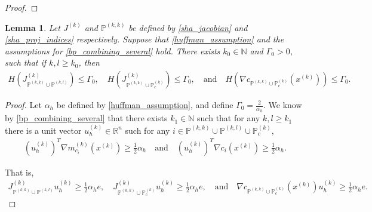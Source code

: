 \documentclass{article}
\newtheorem{lemma}[theorem]{Lemma}
\theoremstyle{case}
\numberwithin{theorem}{subsection}
\newcommand{\gmcik}{{\nabla m_{c_i}^{(k)}\left(\xk\right)}}
\newcommand{\huff}{{\Gamma_0}}
\newcommand{\naturals}{\mathbb N}
\newcommand{\Rn}{\mathbb R^n}
\newcommand{\xk}{x^{(k)}}
\newcommand{\trueactiveprojk}{{\mathbb P_c^{(k)}}}
\newcommand{\activeprojkk}{{\mathbb P^{(k, k)}}}
\newcommand{\activeprojkl}{{\mathbb P^{(k, l)}}}
\newcommand{\jackk}{{J^{(k)}}}
\newcommand{\jackkl}{{J^{(k)}_{\activeprojkk \cup \activeprojkl}}}
\newcommand{\jackt}{{J^{(k)}_{\activeprojkk \cup \trueactiveprojk}}}
\newcommand{\huffalpha}{{\alpha_h}}
\newcommand{\huffdirk}{{u^{(k)}_h}}
\begin{document}
\begin{proof}
\end{proof}


\begin{lemma}
\label{huffman_constant_is_bounded}
Let $\jackk$ and $\activeprojkk$ be defined by \cref{sha_jacobian} and \cref{sha_proj_indices} respectively.
Suppose that \cref{huffman_assumption} and the assumptions for \cref{bp_combining_several} hold.
There exists $k_0 \in \naturals$ and $\huff > 0$, such that if $k, l \ge k_0$, then 
\begin{align*}
H\left(\jackkl \right) \le \huff,
\quad 
H\left(\jackt\right) \le \huff,
\quad \textrm{and} \quad
H\left(\nabla c_{\activeprojkk \cup \trueactiveprojk }\left(\xk\right)\right) \le \huff.
\end{align*}
\end{lemma}

\begin{proof}
Let $\huffalpha$ be defined by \cref{huffman_assumption}, and define $\huff = \frac 2 {\huffalpha}$.
We know by \cref{bp_combining_several} that there exists
$k_1 \in \naturals$ such that for any $k, l \ge k_1$ there is a unit vector 
$ \huffdirk \in \Rn $
such for any $i \in \activeprojkk \cup \activeprojkl \cup \trueactiveprojk$,
\begin{align*}
\left( \huffdirk \right)^T \gmcik \ge \frac 1 2 \huffalpha
\quad \textrm{and} \quad
\left( \huffdirk \right)^T \nabla c_i\left(\xk\right) \ge \frac 1 2 \huffalpha.
\end{align*}


That is,
\begin{align*}
\jackkl \huffdirk \ge \frac 1 2 \huffalpha e,
\quad
\jackt \huffdirk \ge \frac 1 2 \huffalpha e,
\quad \textrm{and} \quad
\nabla c_{\activeprojkk \cup \trueactiveprojk }\left(\xk\right) \huffdirk \ge \frac 1 2 \huffalpha e.
\end{align*}


\end{proof}
\end{document}
